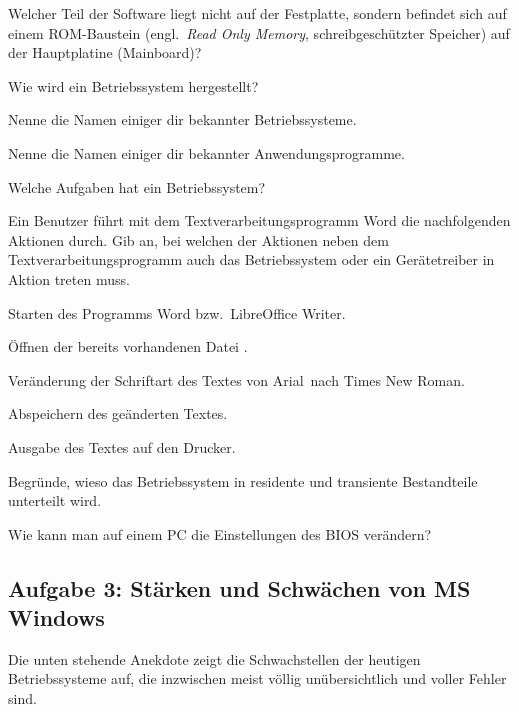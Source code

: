 \begin{compactenum}[a)]
\item Welcher Teil der Software liegt nicht auf der Festplatte, sondern
befindet sich auf einem ROM-Baustein (engl.\ \emph{Read Only Memory},
schreibgeschützter Speicher) auf der Hauptplatine (Mainboard)?

\item Wie wird ein Betriebssystem hergestellt?

\item Nenne die Namen einiger dir bekannter Betriebssysteme.

\item Nenne die Namen einiger dir bekannter Anwendungsprogramme.

\item Welche Aufgaben hat ein Betriebssystem?

\item Ein Benutzer führt mit dem Textverarbeitungsprogramm Word die
nachfolgenden Aktionen durch. Gib an, bei welchen der Aktionen neben dem
Textverarbeitungsprogramm auch das Betriebssystem oder ein Gerätetreiber in
Aktion treten muss.

\begin{compactenum}[1.]
\item Starten des Programms Word bzw.\ LibreOffice Writer.
\item Öffnen der bereits vorhandenen Datei .
\item Veränderung der Schriftart des Textes von \glqq Arial\grqq\ nach
\glqq Times New Roman\grqq .
\item Abspeichern des geänderten Textes.
\item Ausgabe des Textes auf den Drucker.
\end{compactenum}

\item Begründe, wieso das Betriebssystem in residente und transiente Bestandteile
 unterteilt wird.
 
\item Wie kann man auf einem PC die Einstellungen des BIOS verändern?
\end{compactenum}


\subsection{Aufgabe 3: Stärken und Schwächen von MS Windows}

Die unten stehende Anekdote zeigt die Schwachstellen der heutigen
Betriebssysteme auf, die inzwischen meist völlig unübersichtlich und voller
Fehler sind.

